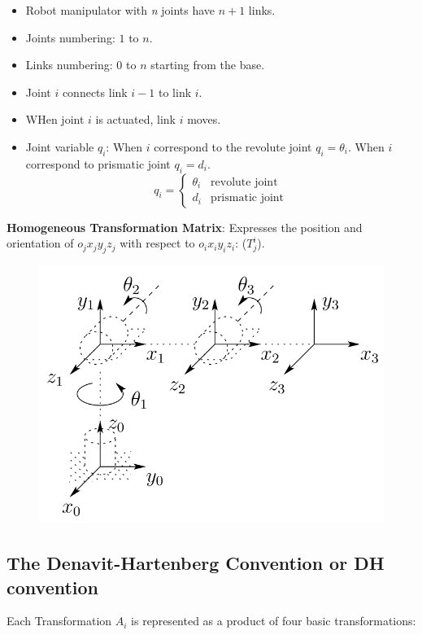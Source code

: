 \documentclass[a4paper,10pt,twocolumn]{article}
\begin{document}
\begin{itemize}
 \item Robot manipulator with \textit{n} joints have $n+1$ links.
 \item Joints numbering: $1$ to $n$.
 \item Links numbering: $0$ to $n$ starting from the base.
 \item Joint $i$ connects link $i-1$ to link $i$.
 \item WHen joint $i$ is actuated, link $i$ moves.
 \item Joint variable $q_i$: When $i$ correspond to the revolute joint $q_i = \theta_i$. When $i$ correspond to prismatic joint $q_i = d_i$.
 $$ q_i=\left\{\begin{array}{cc} \theta_i & \textrm{revolute joint}\\ d_i & \textrm{prismatic joint} \end{array} \right. $$
\end{itemize}

\textbf{Homogeneous Transformation Matrix}: Expresses the position and orientation of $o_jx_jy_jz_j$ with respect to $o_ix_iy_iz_i$: ($T^i_j$).

\begin{figure}[H]
\centering
 \includegraphics[width=0.8\linewidth]{elbowManipulator.png}
\end{figure}

\subsection*{The Denavit-Hartenberg Convention or DH convention}

Each Transformation $A_i$ is represented as a product of four basic transformations:
\end{document}
